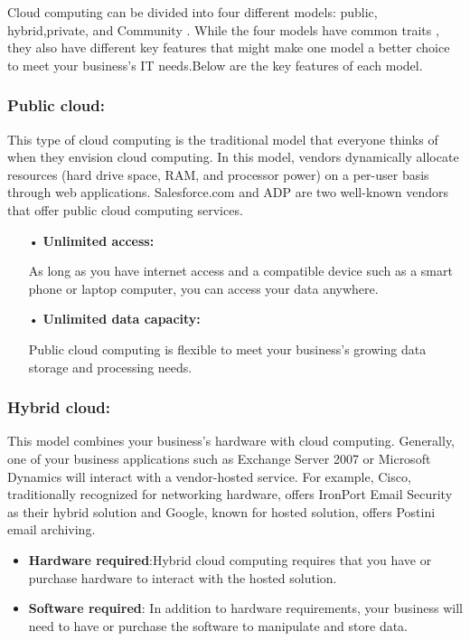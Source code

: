 Cloud computing can be divided into four different models: public, hybrid,private, and Community .
 While the four models have common traits , they also have different
key features that might make one model a better choice to meet your business’s IT needs.Below are the key features of each model.

\subsubsection {Public cloud:}

This type of cloud computing is the traditional model that everyone thinks of when they envision cloud computing. In this model, vendors dynamically allocate resources (hard drive space, RAM, and processor power) on a per-user basis through web applications.
Salesforce.com and ADP are two well-known vendors that offer public cloud computing
services.

\begin{itemize}
\item [•] \textbf {Unlimited access:}

As long as you have internet access and a compatible device such as a smart phone or laptop computer, you can access your data anywhere.

\item [•] \textbf {Unlimited data capacity:} 

Public cloud computing is flexible to meet your business’s growing data storage and processing needs.

\end{itemize}

\subsubsection {Hybrid cloud:}

This model combines your business’s hardware with cloud computing. Generally,
one of your business applications such as Exchange Server 2007 or Microsoft Dynamics will
interact with a vendor-hosted service. For example, Cisco, traditionally recognized for networking hardware, offers IronPort Email Security as their hybrid solution and Google, known
for hosted solution, offers Postini email archiving.

\begin {itemize}
 \item [•] \textbf {Hardware required}:Hybrid cloud computing requires that you have or purchase hardware to interact with the hosted solution.
\item  [•] \textbf {Software required}: In addition to hardware requirements, your business will need to have or purchase the software to manipulate and store data.
\end {itemize}

